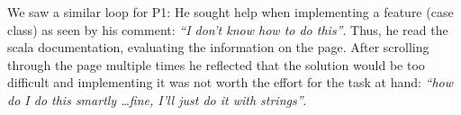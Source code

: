 
We saw a similar loop for P1: He sought help when implementing a feature (case class) as seen by his comment: \emph{``I don't know how to do this''}. Thus, he read the scala documentation, evaluating the information on the page. After scrolling through the page multiple times he reflected that the solution would be too difficult and   implementing it was not worth the effort for the task at hand: \emph{``how do I do this smartly \ldots fine, I'll just do it with strings''}.






